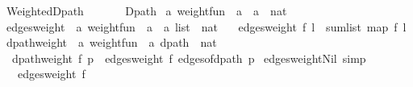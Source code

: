 %
\begin{isabellebody}%
%
%
\isadelimtheory
%
\endisadelimtheory
%
\isatagtheory
{}\isamarkupfalse%
\ Weighted{\isacharunderscore}{\kern0pt}Dpath\isanewline
\ \ \isanewline
\ \ \ \ Dpath\isanewline
{}%
\endisatagtheory
{\isafoldtheory}%
%
\isadelimtheory
\isanewline
%
\endisadelimtheory
\isanewline
{}\isamarkupfalse%
\ {\isacharprime}{\kern0pt}a\ weight{\isacharunderscore}{\kern0pt}fun\ {\isacharequal}{\kern0pt}\ {\isachardoublequoteopen}{\isacharprime}{\kern0pt}a\ {\isasymtimes}\ {\isacharprime}{\kern0pt}a\ {\isasymRightarrow}\ nat{\isachardoublequoteclose}\isanewline
\isanewline
{}\isamarkupfalse%
\ edges{\isacharunderscore}{\kern0pt}weight\ {\isacharcolon}{\kern0pt}{\isacharcolon}{\kern0pt}\ {\isachardoublequoteopen}{\isacharprime}{\kern0pt}a\ weight{\isacharunderscore}{\kern0pt}fun\ {\isasymRightarrow}\ {\isacharparenleft}{\kern0pt}{\isacharprime}{\kern0pt}a\ {\isasymtimes}\ {\isacharprime}{\kern0pt}a{\isacharparenright}{\kern0pt}\ list\ {\isasymRightarrow}\ nat{\isachardoublequoteclose}\ \isanewline
\ \ {\isachardoublequoteopen}edges{\isacharunderscore}{\kern0pt}weight\ f\ l\ {\isacharequal}{\kern0pt}\ sum{\isacharunderscore}{\kern0pt}list\ {\isacharparenleft}{\kern0pt}map\ f\ l{\isacharparenright}{\kern0pt}{\isachardoublequoteclose}\isanewline
\isanewline
{}\isamarkupfalse%
\ dpath{\isacharunderscore}{\kern0pt}weight\ {\isacharcolon}{\kern0pt}{\isacharcolon}{\kern0pt}\ {\isachardoublequoteopen}{\isacharprime}{\kern0pt}a\ weight{\isacharunderscore}{\kern0pt}fun\ {\isasymRightarrow}\ {\isacharprime}{\kern0pt}a\ dpath\ {\isasymRightarrow}\ nat{\isachardoublequoteclose}\ \isanewline
\ \ {\isachardoublequoteopen}dpath{\isacharunderscore}{\kern0pt}weight\ f\ p\ {\isacharequal}{\kern0pt}\ edges{\isacharunderscore}{\kern0pt}weight\ f\ {\isacharparenleft}{\kern0pt}edges{\isacharunderscore}{\kern0pt}of{\isacharunderscore}{\kern0pt}dpath\ p{\isacharparenright}{\kern0pt}{\isachardoublequoteclose}\isanewline
\isanewline
{}\isamarkupfalse%
\ edges{\isacharunderscore}{\kern0pt}weight{\isacharunderscore}{\kern0pt}Nil\ {\isacharbrackleft}{\kern0pt}simp{\isacharbrackright}{\kern0pt}{\isacharcolon}{\kern0pt}\isanewline
\ \ \ {\isachardoublequoteopen}edges{\isacharunderscore}{\kern0pt}weight\ f\ {\isacharbrackleft}{\kern0pt}{\isacharbrackright}{\kern0pt}\ {\isacharequal}{\kern0pt}\ {}{\isachardoublequoteclose}\isanewline

\end{isabellebody}
